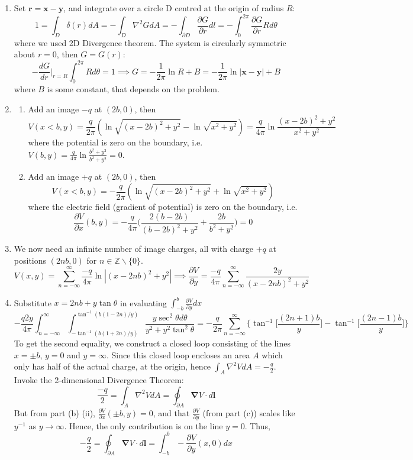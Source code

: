 \documentclass[a4paper]{article}
\begin{document}
\newpage
\begin{ans}\leavevmode
\begin{enumerate}[label=(\alph*)]
\item Set $\mathbf{r}=\mathbf{x}-\mathbf{y}$, and integrate over a circle D centred at the origin of radius $R$:
$$1=\int_D\delta(r)dA=-\int_D\nabla^2GdA=-\int_{\partial D}\frac{\partial G}{\partial r}dl=-\int_0^{2\pi}\frac{\partial G}{\partial r}Rd\theta$$
where we used 2D Divergence theorem. The system is circularly symmetric about $r=0$, then $G=G(r)$:
$$-\frac{dG}{dr}\bigg|_{r=R}\int_0^{2\pi}Rd\theta=1\implies G=-\frac{1}{2\pi}\ln R+B=-\frac{1}{2\pi}\ln|\mathbf{x}-\mathbf{y}|+B$$
where $B$ is some constant, that depends on the problem.
\item 
\begin{enumerate}[label=(\roman*)]
\item Add an image $-q$ at $(2b,0)$, then 
$$V(x<b,y)=\frac{q}{2\pi}(\ln\sqrt{(x-2b)^2+y^2}-\ln\sqrt{x^2+y^2})=\frac{q}{4\pi}\ln\frac{(x-2b)^2+y^2}{x^2+y^2}$$
where the potential is zero on the boundary, i.e. 
$V(b,y)=\frac{q}{4\pi}\ln\frac{b^2+y^2}{b^2+y^2}=0$.
\item Add an image $+q$ at $(2b,0)$, then
$$V(x<b,y)=-\frac{q}{2\pi}(\ln\sqrt{(x-2b)^2+y^2}+\ln\sqrt{x^2+y^2})$$
where the electric field (gradient of potential) is zero on the boundary, i.e.
$$\frac{\partial V}{\partial x}(b,y)=-\frac{q}{4\pi}\bigg(\frac{2(b-2b)}{(b-2b)^2+y^2}+\frac{2b}{b^2+y^2}\bigg)=0$$
\end{enumerate}
\item We now need an infinite number of image charges, all with charge $+q$ at positions $(2nb,0)$ for $n\in\mathbb{Z}\backslash\{0\}$.
$$V(x,y)=\sum_{n=-\infty}^\infty\frac{-q}{4\pi}\ln|(x-2nb)^2+y^2|\implies\frac{\partial V}{\partial y}=\frac{-q}{4\pi}\sum_{n=-\infty}^\infty\frac{2y}{(x-2nb)^2+y^2}$$
\item Substitute $x=2nb+y\tan\theta$ in evaluating $\int_{-b}^b\frac{\partial V}{\partial y}dx$
$$-\frac{q2y}{4\pi}\int_{n=-\infty}^\infty\int_{-\tan^{-1}(b(1+2n)/y)}^{\tan^{-1}(b(1-2n)/y)}\frac{y\sec^2\theta d\theta}{y^2+y^2\tan^2\theta}=-\frac{q}{2\pi}\sum_{n=-\infty}^{\infty}\bigg\{\tan^{-1}\bigg[\frac{(2n+1)b}{y}\bigg]-\tan^{-1}\bigg[\frac{(2n-1)b}{y}\bigg]\bigg\}$$
To get the second equality, we construct a closed loop consisting of the lines $x=\pm b$, $y=0$ and $y=\infty$. Since this closed loop encloses an area $A$ which only has half of the actual charge, at the origin, hence $\int_A\nabla^2VdA=-\frac{q}{2}$. Invoke the 2-dimensional Divergence Theorem:
$$\frac{-q}{2}=\int_A\nabla^2VdA=\oint_{\partial A}\boldsymbol{\nabla}V\cdot d\mathbf{l}$$
But from part (b) (ii), $\frac{\partial V}{\partial x}(\pm b,y)=0$, and that $\frac{\partial V}{\partial y}$ (from part (c)) scales like $y^{-1}$ as $y\rightarrow \infty$. Hence, the only contribution is on the line $y=0$. Thus,
$$-\frac{q}{2}=\oint_{\partial A}\boldsymbol{\nabla}V\cdot d\mathbf{l}=\int_{-b}^b-\frac{\partial V}{\partial y}(x,0)dx$$
\end{enumerate}
\end{ans}
\end{document}
